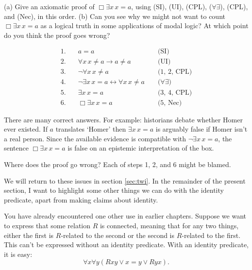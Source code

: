 \begin{exercise}
  (a) Give an axiomatic proof of $\Box \exists x\, x=a$, using (SI), (UI), (CPL),
  ($\forall\exists$), (CPL), and (Nec), in this order. (b) Can you see why we might
  not want to count $\Box\exists x\, x=a$ as a logical truth in some
  applications of modal logic? At which point do you think the proof goes wrong?
\end{exercise}
\begin{solution}
  \begin{sollist}
    
    \item 
\begin{align*}
   1. \quad & a=a &&\text{ (SI)}\\
   2. \quad & \forall x\, x\not= a \to a\not= a &&\text{ (UI)}\\
   3. \quad & \neg \forall x\, x\not=a &&\text{ (1, 2, CPL)}\\
   4. \quad & \neg \exists x\, x=a \leftrightarrow \forall x \, x\not=a &&\text{ ($\forall\exists$)}\\
   5. \quad & \exists x\, x=a &&\text{ (3, 4, CPL)}\\
   6. \quad & \Box\exists x\, x=a &&\text{ (5, Nec)}
\end{align*}

\item There are many correct answers. For example: historians debate whether
Homer ever existed. If $a$ translates `Homer' then $\exists x\, x=a$ is arguably false if Homer isn't a real person. Since the available evidence is compatible with  $\neg \exists x\, x=a$, the sentence $\Box\exists x\, x=a$ is false on an epistemic interpretation of the box.

Where does the proof go wrong? Each of steps 1, 2, and 6 might be blamed.
\end{sollist}
\end{solution}


We will return to these issues in section \ref{sec:twi}. In the remainder of the
present section, I want to highlight some other things we can do with the
identity predicate, apart from making claims about identity.

You have already encountered one other use in earlier chapters. Suppose we want
to express that some relation $R$ is connected, meaning that for any two things,
either the first is $R$-related to the second or the second is $R$-related to
the first. This can't be expressed without an identity predicate. With an
identity predicate, it is easy:
\[
  \forall x\forall y(Rxy \lor x\!=\!y \lor Ryx).
\]

